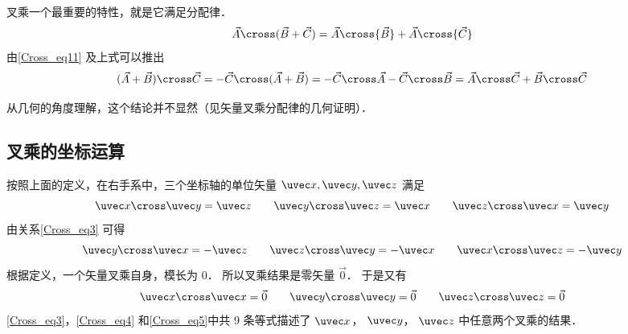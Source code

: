 叉乘一个最重要的特性，就是它满足分配律．
\begin{equation}\label{Cross_eq6}
{\vec A} \cross (\vec B +\vec C) = {\vec A} \cross {\vec B} + {\vec A} \cross {\vec C}
\end{equation}
由\autoref{Cross_eq11} 及上式可以推出
\begin{equation}\label{Cross_eq7}
(\vec A + \vec B) \cross \vec C =  - \vec C \cross (\vec A + \vec B) =  - \vec C \cross \vec A - \vec C \cross \vec B = \vec A \cross \vec C + \vec B \cross \vec C
\end{equation}

从几何的角度理解，这个结论并不显然（见矢量叉乘分配律的几何证明）．

\subsection{叉乘的坐标运算}

按照上面的定义，在右手系中，三个坐标轴的单位矢量 $\uvec x, \uvec y, \uvec z$ 满足
\begin{equation}\label{Cross_eq3}
\uvec x \cross \uvec y = \uvec z
\qquad
\uvec y \cross \uvec z = \uvec x
\qquad
\uvec z \cross \uvec x = \uvec y
\end{equation}
由关系\autoref{Cross_eq3} 可得
\begin{equation}\label{Cross_eq4}
\uvec y \cross \uvec x =  - \uvec z
\qquad
\uvec z \cross \uvec y =  - \uvec x
\qquad
\uvec x \cross \uvec z =  - \uvec y
\end{equation}
根据定义，一个矢量叉乘自身，模长为 $0$． 所以叉乘结果是零矢量 $\vec 0$． 于是又有
\begin{equation}\label{Cross_eq5}
\uvec x \cross \uvec x = \vec 0
\qquad
\uvec y \cross \uvec y = \vec 0
\qquad
\uvec z \cross \uvec z = \vec 0
\end{equation}
\autoref{Cross_eq3}，\autoref{Cross_eq4} 和\autoref{Cross_eq5}中共 9 条等式描述了 $\uvec x$，  $\uvec y$，  $\uvec z$ 中任意两个叉乘的结果．



